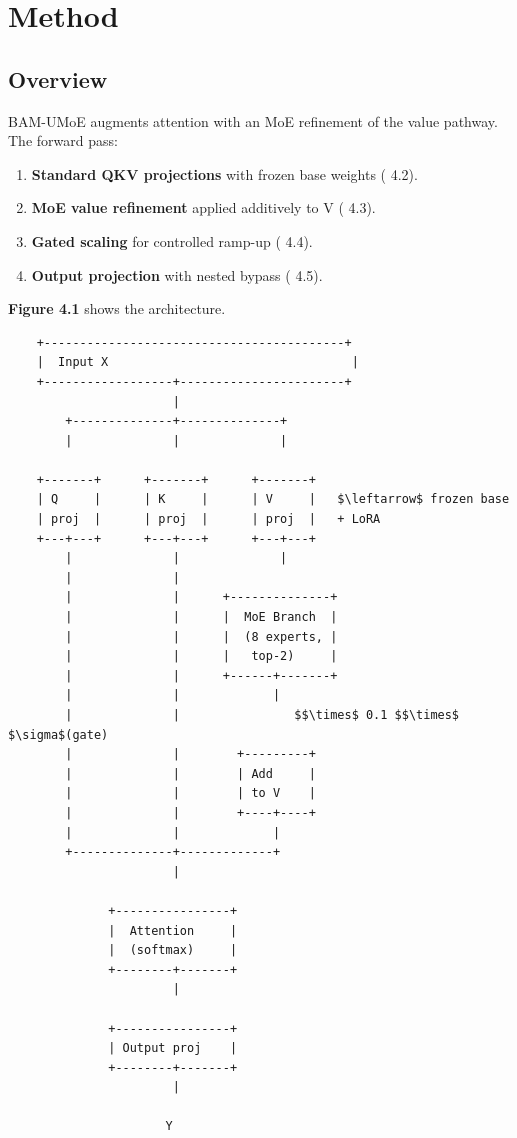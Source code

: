 \section{Method}

\subsection{Overview}

BAM-UMoE augments attention with an MoE refinement of the value pathway. 
The forward pass:

\begin{enumerate}
\item \textbf{Standard QKV projections} with frozen base weights ( 4.2).
\item \textbf{MoE value refinement} applied additively to V ( 4.3).
\item \textbf{Gated scaling} for controlled ramp-up ( 4.4).
\item \textbf{Output projection} with nested bypass ( 4.5).

\end{enumerate}
\textbf{Figure 4.1} shows the architecture.

\begin{lstlisting}
    +------------------------------------------+
    |  Input X                                  |
    +------------------+-----------------------+
                       |
        +--------------+--------------+
        |              |              |
                                       
    +-------+      +-------+      +-------+
    | Q     |      | K     |      | V     |   $\leftarrow$ frozen base
    | proj  |      | proj  |      | proj  |   + LoRA
    +---+---+      +---+---+      +---+---+
        |              |              |
        |              |               
        |              |      +--------------+
        |              |      |  MoE Branch  |
        |              |      |  (8 experts, |
        |              |      |   top-2)     |
        |              |      +------+-------+
        |              |             |
        |              |                $$\times$ 0.1 $$\times$ $\sigma$(gate)
        |              |        +---------+
        |              |        | Add     |
        |              |        | to V    |
        |              |        +----+----+
        |              |             |
        +--------------+-------------+
                       |
                        
              +----------------+
              |  Attention     |
              |  (softmax)     |
              +--------+-------+
                       |
                        
              +----------------+
              | Output proj    |
              +--------+-------+
                       |
                        
                      Y
\end{lstlisting}

